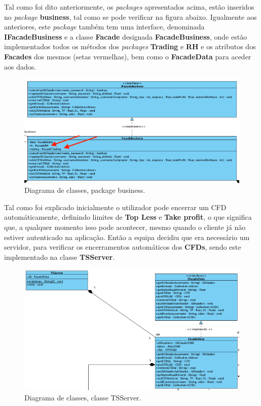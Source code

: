 \documentclass[11pt,a4paper]{report}%
\begin{document}
Tal como foi dito anteriormente, os \emph{packages} apresentados acima, estão inseridos no \emph{package} \textbf{business}, tal como se pode verificar na figura abaixo. Igualmente aos anteriores, este \emph{package} também tem uma interface, denominada \textbf{IFacadeBusiness} e a classe \textbf{Facade} designada \textbf{FacadeBusiness}, onde estão implementados todos os métodos dos \emph{packages} \textbf{Trading} e \textbf{RH} e os atributos dos \textbf{Facades} dos mesmos (setas vermelhas), bem como o \textbf{FacadeData} para aceder aos dados.

\begin{figure}[H]
	\centering
	\includegraphics[scale=0.5]{diagrama-classes-4.png}
	\caption{Diagrama de classes, package business. }
	\label{img:pag}
\end{figure}

Tal como foi explicado inicialmente o utilizador pode encerrar um CFD automáticamente, definindo limites de \textbf{Top Less} e \textbf{Take profit}, o que significa que, a qualquer momento isso pode acontecer, mesmo quando o cliente já não estiver autenticado na aplicação. Então a equipa decidiu que era necessário um servidor, para verificar os encerramentos automáticos dos \textbf{CFDs}, sendo este implementado na classe \textbf{TSServer}.

\begin{figure}[H]
	\centering
	\includegraphics[scale=0.5]{diagrama-classes-5.png}
	\caption{Diagrama de classes, classe TSServer. }
	\label{img:pag}
\end{figure}
\end{document}
